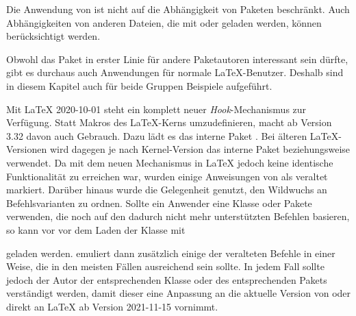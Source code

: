 Die Anwendung von  ist nicht auf die Abhängigkeit von
Paketen beschränkt. Auch Abhängigkeiten von anderen Dateien, die mit
 oder  geladen werden, können
berücksichtigt werden.%
\iffalse%
So kann beispielsweise dafür gesorgt werden, dass das nicht unkritische Laden
einer Datei wie \File{french.ldf} automatisch zu einer Warnung führt.%
\fi

Obwohl das Paket in erster Linie für andere Paketautoren interessant sein
dürfte, gibt es durchaus auch Anwendungen für normale \LaTeX-Benutzer. Deshalb
sind in diesem Kapitel auch für beide Gruppen Beispiele aufgeführt.

\begin{Declaration}
\end{Declaration}
Mit \LaTeX{} 2020-10-01 steht ein
komplett neuer \emph{Hook}-Mechanismus zur Verfügung. Statt Makros des
\LaTeX-Kerns umzudefinieren, macht  ab Version 3.32 davon
auch Gebrauch. Dazu lädt es das interne Paket
. Bei älteren
\LaTeX-Versionen wird dagegen je
 nach Kernel-Version das interne Paket
beziehungsweise %
 verwendet. Da mit dem neuen
Mechanismus in \LaTeX{} jedoch keine identische Funktionalität zu erreichen
war, wurden einige Anweisungen von  als veraltet
markiert. Darüber hinaus wurde die Gelegenheit genutzt, den Wildwuchs an
Befehlsvarianten zu ordnen. Sollte ein Anwender eine Klasse oder Pakete
verwenden, die noch auf den dadurch nicht mehr unterstützten Befehlen
basieren, so kann vor  vor dem Laden der Klasse mit
\begin{lstcode}
  \RequirePackage[withdeprecated]{scrlfile}
\end{lstcode}
geladen werden.  emuliert dann zusätzlich einige der
veralteten Befehle in einer Weise, die in den meisten Fällen ausreichend sein
sollte. In jedem Fall sollte jedoch der Autor der entsprechenden Klasse oder
des entsprechenden Pakets verständigt werden, damit dieser eine Anpassung an
die aktuelle Version von  oder direkt an \LaTeX{} ab Version
2021-11-15 vornimmt.%
%
\EndIndexGroup


